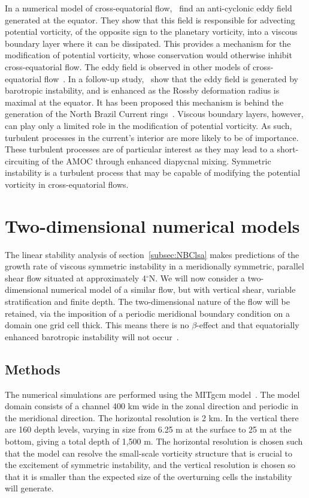 In a numerical model of cross-equatorial flow,~\citet{Edwards1998I} find an anti-cyclonic eddy field generated at the equator. They show that this field is responsible for advecting potential vorticity, of the opposite sign to the planetary vorticity, into a viscous boundary layer where it can be dissipated. This provides a mechanism for the modification of potential vorticity, whose conservation would otherwise inhibit cross-equatorial flow. The eddy field is observed in other models of cross-equatorial flow~\citep[e.g.][]{Jochum2003, Goes2009}. In a follow-up study,~\citet{Edwards1998II} show that the eddy field is generated by barotropic instability, and is enhanced as the Rossby deformation radius is maximal at the equator. It has been proposed this mechanism is behind the generation of the North Brazil Current rings~\citep{Jochum2003}. Viscous boundary layers, however, can play only a limited role in the modification of potential vorticity. As such, turbulent processes in the current's interior are more likely to be of importance. These turbulent processes are of particular interest as they may lead to a short-circuiting of the AMOC through enhanced diapycnal mixing. Symmetric instability is a turbulent process that may be capable of modifying the potential vorticity in cross-equatorial flows.

\section{Two-dimensional numerical models}
\label{sec:2DModels}
The linear stability analysis of section~\ref{subsec:NBClsa} makes predictions of the growth rate of viscous symmetric instability in a meridionally symmetric, parallel shear flow situated at approximately 4$^\circ$N. We will now consider a two-dimensional numerical model of a similar flow, but with vertical shear, variable stratification and finite depth. The two-dimensional nature of the flow will be retained, via the imposition of a periodic meridional boundary condition on a domain one grid cell thick. This means there is no $\beta$-effect and that equatorially enhanced barotropic instability will not occur~\citep{Edwards1998I, Edwards1998II}.

\subsection{Methods}
\label{subsec:2DMethods}
The numerical simulations are performed using the MITgcm model~\citep{Marshall1997}. The model domain consists of a channel 400 km wide in the zonal direction and periodic in the meridional direction. The horizontal resolution is 2 km. In the vertical there are 160 depth levels, varying in size from 6.25 m at the surface to 25 m at the bottom, giving a total depth of 1,500 m. The horizontal resolution is chosen such that the model can resolve the small-scale vorticity structure that is crucial to the excitement of symmetric instability, and the vertical resolution is chosen so that it is smaller than the expected size of the overturning cells the instability will generate.

